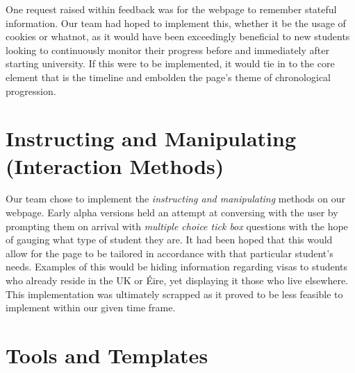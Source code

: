 \documentclass[a4paper, notoc]{tufte-handout}
\begin{document}
One request raised within feedback was for the webpage to remember stateful information. Our team had hoped to implement this, whether it be the usage of cookies or whatnot, as it would have been exceedingly beneficial to new students looking to continuously monitor their progress before and immediately after starting university. If this were to be implemented, it would tie in to the core element that is the timeline and embolden the page's theme of chronological progression.

\section{Instructing and Manipulating (Interaction Methods)}\label{instructing-and-manipulatinginteraction-methods}

Our team chose to implement the \textit{instructing and manipulating} methods on our webpage. Early alpha versions held an attempt at conversing with the user by prompting them on arrival with \textit{multiple choice tick box} questions with the hope of gauging what type of student they are. It had been hoped that this would allow for the page to be tailored in accordance with that particular student's needs. Examples of this would be hiding information regarding visas to students who already reside in the UK or Éire, yet displaying it those who live elsewhere. This implementation was ultimately scrapped as it proved to be less feasible to implement within our given time frame.


\section{Tools and Templates}

\end{document}
